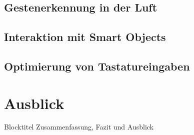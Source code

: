 \documentclass[ngerman]{presentation}
\begin{document}
\subsection{Gestenerkennung in der Luft}


\subsection{Interaktion mit Smart Objects}


\subsection{Optimierung von Tastatureingaben}


\section{Ausblick}
\begin{frame}
\begin{block}{Blocktitel}
Zusammenfassung, Fazit und Ausblick
\end{block}
\end{frame}

\end{document}
